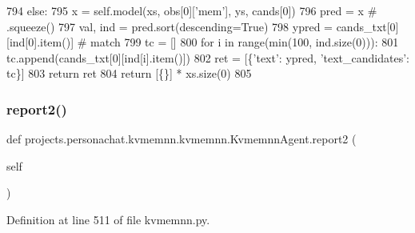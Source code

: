 \begin{DoxyCode}
794                 \textcolor{keywordflow}{else}:
795                     x = self.model(xs, obs[0][\textcolor{stringliteral}{'mem'}], ys, cands[0])
796                     pred = x  \textcolor{comment}{# .squeeze()}
797                 val, ind = pred.sort(descending=\textcolor{keyword}{True})
798                 ypred = cands\_txt[0][ind[0].item()]  \textcolor{comment}{# match}
799                 tc = []
800                 \textcolor{keywordflow}{for} i \textcolor{keywordflow}{in} range(min(100, ind.size(0))):
801                     tc.append(cands\_txt[0][ind[i].item()])
802             ret = [\{\textcolor{stringliteral}{'text'}: ypred, \textcolor{stringliteral}{'text\_candidates'}: tc\}]
803             \textcolor{keywordflow}{return} ret
804         \textcolor{keywordflow}{return} [\{\}] * xs.size(0)
805 
\end{DoxyCode}
\mbox{\label{classprojects_1_1personachat_1_1kvmemnn_1_1kvmemnn_1_1KvmemnnAgent_a4b5b1dd2efa6f00f39f773f0b48edfc7}} 
\subsubsection{\texorpdfstring{report2()}{report2()}}
{\footnotesize\ttfamily def projects.\+personachat.\+kvmemnn.\+kvmemnn.\+Kvmemnn\+Agent.\+report2 (\begin{DoxyParamCaption}\item[{}]{self }\end{DoxyParamCaption})}



Definition at line 511 of file kvmemnn.\+py.


